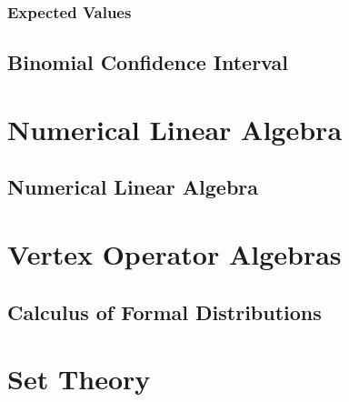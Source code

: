 \documentclass{report}
\begin{document}
\subsection{Expected Values}


\section{Binomial Confidence Interval}


\chapter{Numerical Linear Algebra}
\section{Numerical Linear Algebra}



\chapter{Vertex Operator Algebras}
\section{Calculus of Formal Distributions}


\vfill\eject
\appendix
\chapter{Set Theory}


\end{document}
